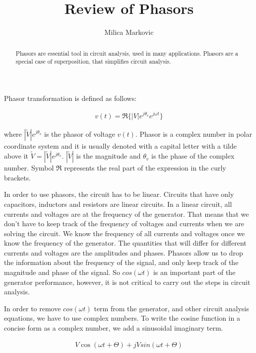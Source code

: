 \documentclass{ximera}
\title{Review of Phasors}
\author{Milica Markovic}
\begin{document}
  
\begin{abstract}  
Phasors are essential tool in circuit analysis, used in many applications. Phasors are a special case of superposition, that simplifies circuit analysis. 
\end{abstract}  
\maketitle    


\begin{definition}
Phasor transformation is defined as follows:

\begin{eqnarray}
v(t)=\Re\{|V|e^{j\theta_v} e^{j \omega t}\}
\end{eqnarray}

where $|\widetilde{V}|e^{j\theta_v}$ is the phasor of voltage $v(t)$. Phasor is a complex number in polar coordinate system and it is usually denoted with a capital letter with a tilde above it $\widetilde{V} = |\widetilde{V}|e^{j\theta_v}$. $ |\widetilde{V}|$ is the magnitude and $\theta_v$ is the phase of the complex number. Symbol $\Re$ represents the real part of the expression in the curly brackets. 

\end{definition}



In order to use phasors, the circuit has to be linear. Circuits that have  only capacitors, inductors and resistors are 
linear circuits.  In  a  linear circuit, all currents and voltages are  at the frequency of the generator. That means that we don't have to keep track  of the frequency of voltages and currents when we are solving the circuit. We know the frequency of all currents and voltages once we know the frequency of the generator. The quantities that will differ for different currents and voltages are the amplitudes and phases. Phasors allow us to drop the information about the frequency of the signal, and only  keep track of the magnitude and phase of the signal. So $cos (\omega t)$ is an important part of the generator performance, however, it is not critical to carry out the steps in circuit analysis.


 In order to remove $cos (\omega t)$  term from the generator, and other circuit analysis equations,
we have to use complex numbers.  To write the cosine  function  in a concise form  as a complex number, we add  a sinusoidal imaginary term.

\begin{eqnarray}
 V \cos (\omega t + \Theta ) + j V sin (\omega t + \Theta) 
\end{eqnarray}
\end{document}
